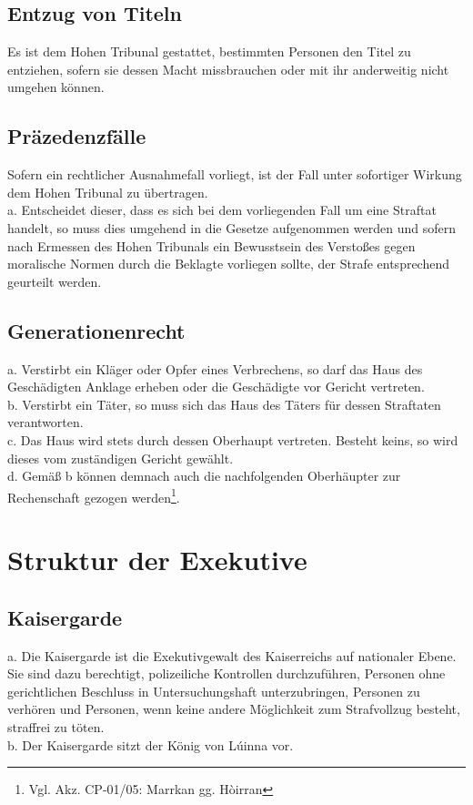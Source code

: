 \documentclass{article}
\begin{document}
\subsection{Entzug von Titeln}
Es ist dem Hohen Tribunal gestattet, bestimmten Personen den Titel zu entziehen, sofern sie dessen Macht missbrauchen oder mit ihr anderweitig nicht umgehen können.

\subsection{Präzedenzfälle}
Sofern ein rechtlicher Ausnahmefall vorliegt, ist der Fall unter sofortiger Wirkung dem Hohen Tribunal zu übertragen.\\
a. Entscheidet dieser, dass es sich bei dem vorliegenden Fall um eine Straftat handelt, so muss dies umgehend in die Gesetze aufgenommen werden und
sofern nach Ermessen des Hohen Tribunals ein Bewusstsein des Verstoßes gegen moralische Normen durch die Beklagte vorliegen sollte, der Strafe entsprechend
geurteilt werden.

\subsection{Generationenrecht}
a. Verstirbt ein Kläger oder Opfer eines Verbrechens, so darf das Haus des Geschädigten Anklage erheben oder die Geschädigte vor Gericht vertreten.\\
b. Verstirbt ein Täter, so muss sich das Haus des Täters für dessen Straftaten verantworten.\\
c. Das Haus wird stets durch dessen Oberhaupt vertreten. Besteht keins, so wird dieses vom zuständigen Gericht gewählt.\\
d. Gemäß b können demnach auch die nachfolgenden Oberhäupter zur Rechenschaft gezogen werden\footnote{Vgl. Akz. CP-01/05: Marrkan gg. Hòirran}.

\section{Struktur der Exekutive}
\subsection{Kaisergarde}
a.	Die Kaisergarde ist die Exekutivgewalt des Kaiserreichs auf nationaler Ebene. Sie sind dazu berechtigt, polizeiliche Kontrollen durchzuführen, Personen ohne gerichtlichen Beschluss in Untersuchungshaft unterzubringen, Personen zu verhören und Personen, wenn keine andere Möglichkeit zum Strafvollzug besteht, straffrei zu töten.\\
b.	Der Kaisergarde sitzt der König von Lúinna vor.
\end{document}
